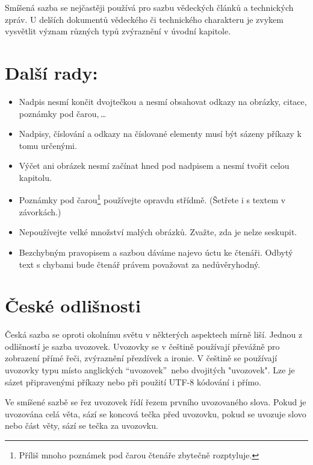 \documentclass[10pt, a4paper, twocolumn]{article}
\begin{document}
\indent Smíšená sazba se nejčastěji používá pro sazbu vědeckých článků a technických zpráv. U delších dokumentů vědeckého či technického charakteru je zvykem vysvětlit význam různých typů zvýraznění v úvodní kapitole.\par

\section{Další rady:} \label{sec:nadpis3}
\begin{itemize}
    \item Nadpis nesmí končit dvojtečkou a nesmí obsahovat odkazy na obrázky, citace, poznámky pod čarou,\,\dots
    \item Nadpisy, číslování a odkazy na číslované elementy musí být sázeny příkazy k tomu určenými.
    \item Výčet ani obrázek nesmí začínat hned pod nadpisem a nesmí tvořit celou kapitolu.
    \item Poznámky pod čarou\footnote{Příliš mnoho poznámek pod čarou čtenáře zbytečně rozptyluje.} používejte opravdu střídmě. (Šetřete i s textem v závorkách.)
    \item Nepoužívejte velké množství malých obrázků. Zvažte, zda je nelze seskupit.
	\item Bezchybným pravopisem a sazbou dáváme najevo úctu ke čtenáři. Odbytý text s chybami bude čtenář právem považovat za nedůvěryhodný.
\end{itemize}

\section{České odlišnosti}

Česká sazba se oproti okolnímu světu v některých aspektech mírně liší. Jednou z odlišností je sazba uvozovek. Uvozovky se v češtině používají převážně pro zobrazení přímé řeči, zvýraznění přezdívek a ironie. V češtině se používají uvozovky typu  místo anglických \textquotedblleft uvozovek\textquotedblright\ nebo dvojitých "uvozovek". Lze je sázet připravenými příkazy nebo při použití UTF-8 kódování i přímo.\par

\indent Ve smíšené sazbě se řez uvozovek řídí řezem prvního uvozovaného slova. Pokud je uvozována celá věta, sází se koncová tečka před uvozovku, pokud se uvozuje slovo nebo část věty, sází se tečka za uvozovku.\par
\end{document}
